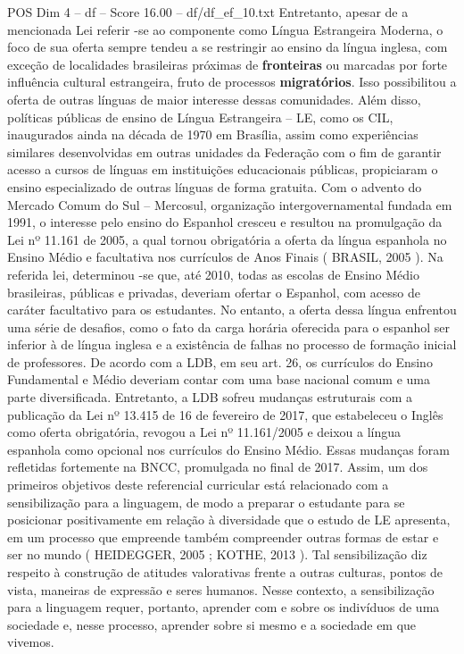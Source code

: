 \begin{textsample}{POS Dim 4 – df – Score 16.00 – df/df\_ef\_10.txt}
Entretanto, apesar de a mencionada Lei referir -se ao componente como Língua Estrangeira Moderna, o foco de sua oferta sempre tendeu a se restringir ao ensino da língua inglesa, com exceção de localidades brasileiras próximas de \textbf{fronteiras} ou marcadas por forte influência cultural estrangeira, fruto de processos \textbf{migratórios}.
Isso possibilitou a oferta de outras línguas de maior interesse dessas comunidades.
Além disso, políticas públicas de ensino de Língua Estrangeira – LE, como os CIL, inaugurados ainda na década de 1970 em Brasília, assim como experiências similares desenvolvidas em outras unidades da Federação com o fim de garantir acesso a cursos de línguas em instituições educacionais públicas, propiciaram o ensino especializado de outras línguas de forma gratuita.
Com o advento do Mercado Comum do Sul – Mercosul, organização intergovernamental fundada em 1991, o interesse pelo ensino do Espanhol cresceu e resultou na promulgação da Lei nº 11.161 de 2005, a qual tornou obrigatória a oferta da língua espanhola no Ensino Médio e facultativa nos currículos de Anos Finais ( BRASIL, 2005 ).
Na referida lei, determinou -se que, até 2010, todas as escolas de Ensino Médio brasileiras, públicas e privadas, deveriam ofertar o Espanhol, com acesso de caráter facultativo para os estudantes.
No entanto, a oferta dessa língua enfrentou uma série de desafios, como o fato da carga horária oferecida para o espanhol ser inferior à de língua inglesa e a existência de falhas no processo de formação inicial de professores.
De acordo com a LDB, em seu art. 26, os currículos do Ensino Fundamental e Médio deveriam contar com uma base nacional comum e uma parte diversificada.
Entretanto, a LDB sofreu mudanças estruturais com a publicação da Lei nº 13.415 de 16 de fevereiro de 2017, que estabeleceu o Inglês como oferta obrigatória, revogou a Lei nº 11.161/2005 e deixou a língua espanhola como opcional nos currículos do Ensino Médio.
Essas mudanças foram refletidas fortemente na BNCC, promulgada no final de 2017.
Assim, um dos primeiros objetivos deste referencial curricular está relacionado com a sensibilização para a linguagem, de modo a preparar o estudante para se posicionar positivamente em relação à diversidade que o estudo de LE apresenta, em um processo que empreende também compreender outras formas de estar e ser no mundo ( HEIDEGGER, 2005 ; KOTHE, 2013 ).
Tal sensibilização diz respeito à construção de atitudes valorativas frente a outras culturas, pontos de vista, maneiras de expressão e seres humanos.
Nesse contexto, a sensibilização para a linguagem requer, portanto, aprender com e sobre os indivíduos de uma sociedade e, nesse processo, aprender sobre si mesmo e a sociedade em que vivemos.

\end{textsample}
